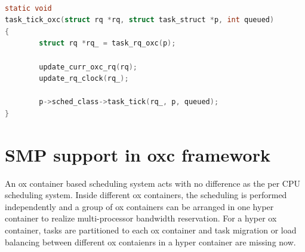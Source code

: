 \begin{lstlisting}[language=C, label={lst:task_tick_oxc},
		caption={The most frequently called entry to update a container's runtime}]
			
static void 
task_tick_oxc(struct rq *rq, struct task_struct *p, int queued)
{
        struct rq *rq_ = task_rq_oxc(p);

        update_curr_oxc_rq(rq);
        update_rq_clock(rq_);

        p->sched_class->task_tick(rq_, p, queued);
}
\end{lstlisting}

\section{SMP support in oxc framework}
An ox container based scheduling system acts with no difference as the 
per CPU scheduling system. Inside different ox containers, the 
scheduling is performed independently and a group of ox containers
can be arranged in one hyper container to realize multi-processor 
bandwidth reservation. For a hyper ox container, tasks are partitioned 
to each ox container and task migration or load balancing between 
different ox contaienrs in a hyper container are missing now.

